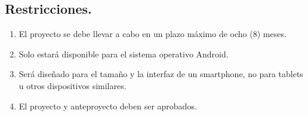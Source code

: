 
\subsection{Restricciones.}

\begin{enumerate}
    \item El proyecto se debe llevar a cabo en un plazo máximo de ocho (8) meses.
    \item Solo estará disponible para el sistema operativo Android.
    \item Será diseñado para el tamaño y la interfaz de un smartphone, no para tablets u otros dispositivos similares.
    \item El proyecto y anteproyecto deben ser aprobados.
\end{enumerate}

